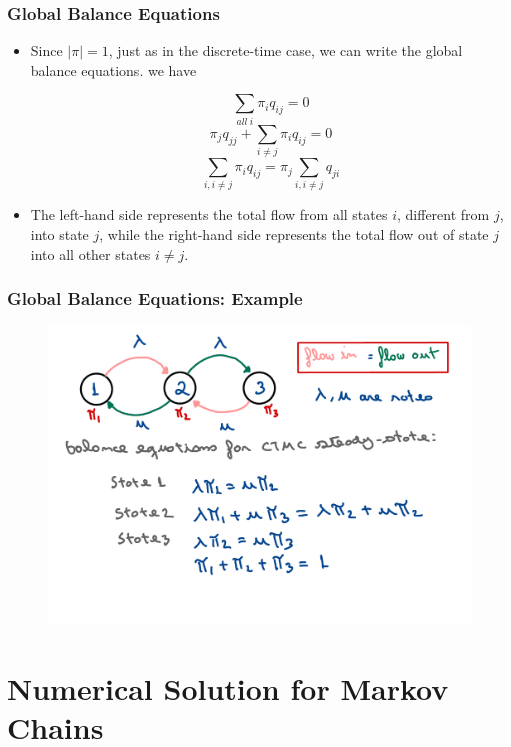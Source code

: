 \begin{frame}
    \frametitle{Global Balance Equations}

        \begin{itemize}
            \item Since $|\pi| = 1$, just as in the discrete-time case, we can write the
            global balance equations. we have

            $$\sum_{all~i}\pi_i q_{ij} = 0$$
            $$\pi_j q_{jj} + \sum_{i\neq j}\pi_i q_{ij} = 0$$
            $$\sum_{i,i\neq j}\pi_i q_{ij} = \pi_j\sum_{i,i\neq j}q_{ji}$$

            \item The left-hand side represents the total flow from all states $i$, different from $j$, into 
            state $j$, while the right-hand side represents the total flow out of state $j$ into all other states $i\neq j$.

        \end{itemize}
\end{frame}


\begin{frame}
    \frametitle{Global Balance Equations: Example}
    \begin{figure}
        \centering
        \includegraphics[width=1\textwidth]{slides/figures/ctmc_balance_equations_example.pdf}
    \end{figure}
\end{frame}

\section{Numerical Solution for Markov Chains}



